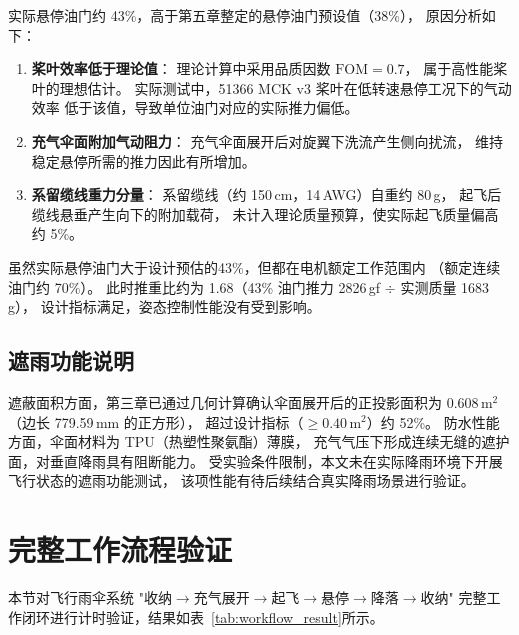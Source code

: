 实际悬停油门约 43\%，高于第五章整定的悬停油门预设值（38\%），
原因分析如下：

\begin{enumerate}
    \item \textbf{桨叶效率低于理论值}：
    理论计算中采用品质因数 $\text{FOM} = 0.7$，
    属于高性能桨叶的理想估计。
    实际测试中，51366 MCK v3 桨叶在低转速悬停工况下的气动效率
    低于该值，导致单位油门对应的实际推力偏低。

    \item \textbf{充气伞面附加气动阻力}：
    充气伞面展开后对旋翼下洗流产生侧向扰流，
    维持稳定悬停所需的推力因此有所增加。

    \item \textbf{系留缆线重力分量}：
    系留缆线（约 150\,cm，14\,AWG）自重约 80\,g，
    起飞后缆线悬垂产生向下的附加载荷，
    未计入理论质量预算，使实际起飞质量偏高约 5\%。
\end{enumerate}

虽然实际悬停油门大于设计预估的43\%，但都在电机额定工作范围内
（额定连续油门约 70\%）。
此时推重比约为 1.68（43\% 油门推力 2826\,gf $\div$ 实测质量 1683\,g），
设计指标满足，姿态控制性能没有受到影响。


\subsection{遮雨功能说明}

遮蔽面积方面，第三章已通过几何计算确认伞面展开后的正投影面积为
$0.608\,\text{m}^2$（边长 779.59\,mm 的正方形），
超过设计指标（$\geq 0.40\,\text{m}^2$）约 52\%。
防水性能方面，伞面材料为 TPU（热塑性聚氨酯）薄膜，
充气气压下形成连续无缝的遮护面，对垂直降雨具有阻断能力。
受实验条件限制，本文未在实际降雨环境下开展飞行状态的遮雨功能测试，
该项性能有待后续结合真实降雨场景进行验证。





\section{完整工作流程验证}

本节对飞行雨伞系统
"收纳$\rightarrow$充气展开$\rightarrow$起飞$\rightarrow$悬停$\rightarrow$降落$\rightarrow$收纳"
完整工作闭环进行计时验证，结果如表~\ref{tab:workflow_result}所示。

